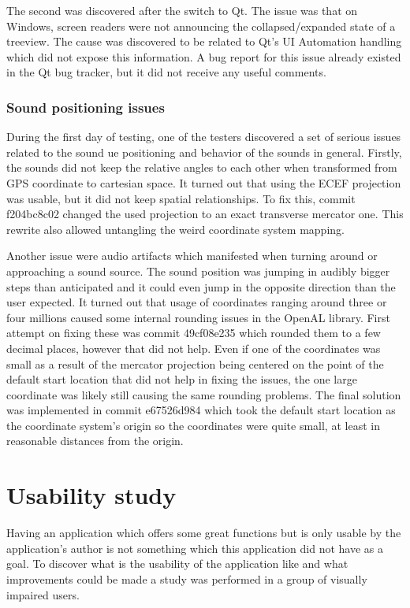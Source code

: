 \documentclass[nolof,digital]{fithesis3}
\begin{document}
The second was discovered after the switch to Qt. The issue was that on Windows, screen readers were not announcing the collapsed/expanded state of a treeview. The cause was discovered to be related to Qt's UI Automation handling which did not expose this information. A bug report for this issue already existed in the Qt bug tracker, but it did not receive any useful comments.
\subsection{Sound positioning issues}
During the first day of testing, one of the testers discovered a set of serious issues related to the sound ue positioning and behavior of the sounds in general. Firstly, the sounds did not keep the relative angles to each other when transformed from GPS coordinate to cartesian space. It turned out that using the ECEF projection was usable, but it did not keep spatial relationships. To fix this, commit f204bc8c02 changed the used projection to an exact transverse mercator one. This rewrite also allowed untangling the weird coordinate system mapping.

Another issue were audio artifacts which manifested when turning around or approaching a sound source. The sound position was jumping in audibly bigger steps than anticipated and it could even jump in the opposite direction than the user expected. It turned out that usage of coordinates ranging around three or four millions caused some internal rounding issues in the OpenAL library. First attempt on fixing these was commit 49cf08e235 which rounded them to a few decimal places, however that did not help. Even if one of the coordinates was small as a result of the mercator projection being centered on the point of the default start location that did not help in fixing the issues, the one large coordinate was likely still causing the same rounding problems. The final solution was implemented in commit e67526d984 which took the default start location as the coordinate system's origin so the coordinates were quite small, at least in reasonable distances from the origin.
\chapter{Usability study}
Having an application which offers some great functions but is only usable by the application's author is not something which this application did not have as a goal. To discover what is the usability of the application like and what improvements could be made a study was performed in a group of visually impaired users.
\end{document}

